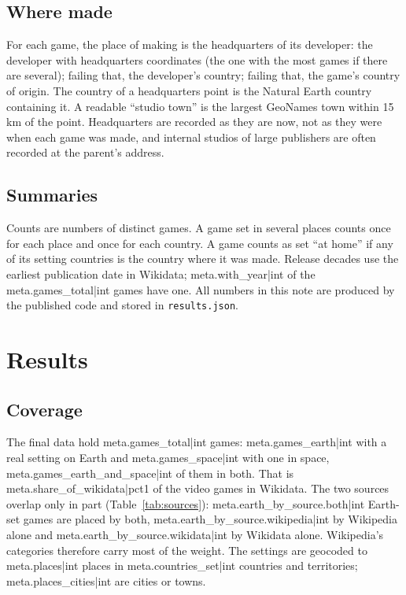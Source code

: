 \documentclass[11pt,a4paper]{article}
\begin{document}
\subsection{Where made}

For each game, the place of making is the headquarters of its developer: the developer with headquarters coordinates (the one with the most games if there are several); failing that, the developer's country; failing that, the game's country of origin. The country of a headquarters point is the Natural Earth country containing it. A readable ``studio town'' is the largest GeoNames town within 15 km of the point. Headquarters are recorded as they are now, not as they were when each game was made, and internal studios of large publishers are often recorded at the parent's address.

\subsection{Summaries}

Counts are numbers of distinct games. A game set in several places counts once for each place and once for each country. A game counts as set ``at home'' if any of its setting countries is the country where it was made. Release decades use the earliest publication date in Wikidata; {{meta.with_year|int}} of the {{meta.games_total|int}} games have one. All numbers in this note are produced by the published code and stored in \texttt{results.json}.

\section{Results}

\subsection{Coverage}

The final data hold {{meta.games_total|int}} games: {{meta.games_earth|int}} with a real setting on Earth and {{meta.games_space|int}} with one in space, {{meta.games_earth_and_space|int}} of them in both. That is {{meta.share_of_wikidata|pct1}} of the video games in Wikidata. The two sources overlap only in part (Table~\ref{tab:sources}): {{meta.earth_by_source.both|int}} Earth-set games are placed by both, {{meta.earth_by_source.wikipedia|int}} by Wikipedia alone and {{meta.earth_by_source.wikidata|int}} by Wikidata alone. Wikipedia's categories therefore carry most of the weight. The settings are geocoded to {{meta.places|int}} places in {{meta.countries_set|int}} countries and territories; {{meta.places_cities|int}} are cities or towns.
\end{document}
